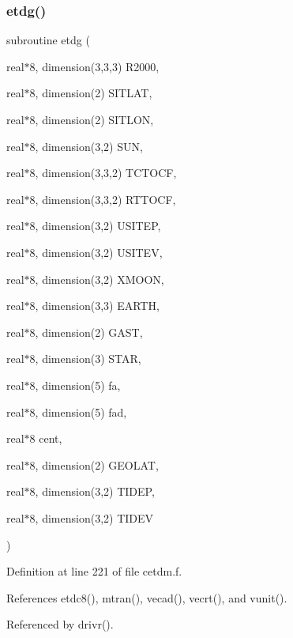 \subsubsection{\texorpdfstring{etdg()}{etdg()}}
{\footnotesize\ttfamily subroutine etdg (\begin{DoxyParamCaption}\item[{real$\ast$8, dimension(3,3,3)}]{R2000,  }\item[{real$\ast$8, dimension(2)}]{S\+I\+T\+L\+AT,  }\item[{real$\ast$8, dimension(2)}]{S\+I\+T\+L\+ON,  }\item[{real$\ast$8, dimension(3,2)}]{S\+UN,  }\item[{real$\ast$8, dimension(3,3,2)}]{T\+C\+T\+O\+CF,  }\item[{real$\ast$8, dimension(3,3,2)}]{R\+T\+T\+O\+CF,  }\item[{real$\ast$8, dimension(3,2)}]{U\+S\+I\+T\+EP,  }\item[{real$\ast$8, dimension(3,2)}]{U\+S\+I\+T\+EV,  }\item[{real$\ast$8, dimension(3,2)}]{X\+M\+O\+ON,  }\item[{real$\ast$8, dimension(3,3)}]{E\+A\+R\+TH,  }\item[{real$\ast$8, dimension(2)}]{G\+A\+ST,  }\item[{real$\ast$8, dimension(3)}]{S\+T\+AR,  }\item[{real$\ast$8, dimension(5)}]{fa,  }\item[{real$\ast$8, dimension(5)}]{fad,  }\item[{real$\ast$8}]{cent,  }\item[{real$\ast$8, dimension(2)}]{G\+E\+O\+L\+AT,  }\item[{real$\ast$8, dimension(3,2)}]{T\+I\+D\+EP,  }\item[{real$\ast$8, dimension(3,2)}]{T\+I\+D\+EV }\end{DoxyParamCaption})}



Definition at line 221 of file cetdm.\+f.



References etdc8(), mtran(), vecad(), vecrt(), and vunit().



Referenced by drivr().

\mbox{\label{cetdm_8f_afc9e45a1757356472ae9754f34245dbd}} 
